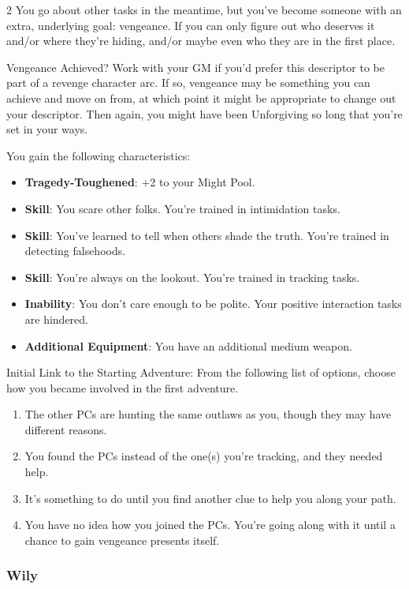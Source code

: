 \begin{multicols}{2}
You go about other tasks in the meantime, but you’ve become someone with an extra, underlying goal: vengeance. If you can only figure out who deserves it and/or where they’re hiding, and/or maybe even who they are in the first place.

Vengeance Achieved? Work with your GM if you’d prefer this descriptor to be part of a revenge character arc. If so, vengeance may be something you can achieve and move on from, at which point it might be appropriate to change out your descriptor. Then again, you might have been Unforgiving so long that you’re set in your ways. 

You gain the following characteristics: 

\begin{itemize}
\item \textbf{Tragedy-Toughened}: +2 to your Might Pool. 
\item \textbf{Skill}: You scare other folks. You’re trained in intimidation tasks. 
\item \textbf{Skill}: You’ve learned to tell when others shade the truth. You’re trained in detecting falsehoods. 
\item \textbf{Skill}: You’re always on the lookout. You’re trained in tracking tasks.
\item \textbf{Inability}: You don’t care enough to be polite. Your positive interaction tasks are hindered. 
\item \textbf{Additional Equipment}: You have an additional medium weapon. 
\end{itemize}

Initial Link to the Starting Adventure: From the following list of options, choose how you became involved in the first adventure. 

\begin{enumerate}
\item The other PCs are hunting the same outlaws as you, though they may have different reasons. 
\item You found the PCs instead of the one(s) you’re tracking, and they needed help. 
\item It’s something to do until you find another clue to help you along your path. 
\item You have no idea how you joined the PCs. You’re going along with it until a chance to gain vengeance presents itself.
\end{enumerate}

\subsubsection{Wily}


\end{multicols}
